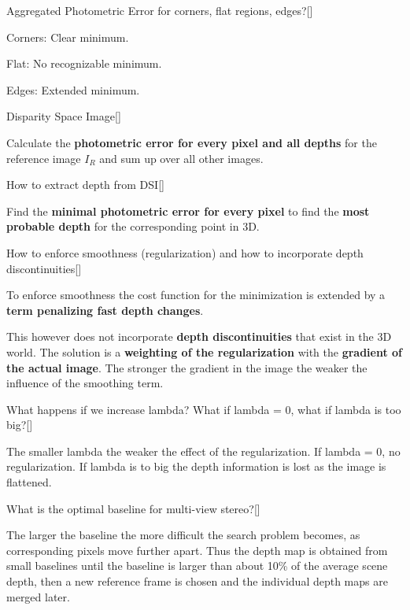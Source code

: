 \documentclass[10pt,a4paper]{scrartcl}
\begin{document}
\begin{multicols*}{2}
\begin{QandA}{Aggregated Photometric Error for corners, flat regions, edges?}[\Comparison]
\item Corners: Clear minimum.
\item Flat: No recognizable minimum.
\item Edges: Extended minimum.
\end{QandA}

\begin{QandA}{Disparity Space Image}[\Definition]
\item Calculate the \textbf{photometric error for every pixel and all depths} for the reference image $I_R$ and sum up over all other images.
\end{QandA}

\begin{QandA}{How to extract depth from DSI}[\Application]
\item Find the \textbf{minimal photometric error for every pixel} to find the \textbf{most probable depth} for the corresponding point in 3D.
\end{QandA}

\begin{QandA}{How to enforce smoothness (regularization) and how to incorporate depth discontinuities}[\Derivation]
\item To enforce smoothness the cost function for the minimization is extended by a \textbf{term penalizing fast depth changes}.
\item This however does not incorporate \textbf{depth discontinuities} that exist in the 3D world. The solution is a \textbf{weighting of the regularization} with the \textbf{gradient of the actual image}. The stronger the gradient in the image the weaker the influence of the smoothing term.
\end{QandA}

\begin{QandA}{What happens if we increase lambda? What if lambda = 0, what if lambda is too big?}[\Application]
\item The smaller lambda the weaker the effect of the regularization. If lambda = 0, no regularization. If lambda is to big the depth information is lost as the image is flattened.
\end{QandA}

\begin{QandA}
{What is the optimal baseline for multi-view stereo?}[\Application]
\item The larger the baseline the more difficult the search problem becomes, as corresponding pixels move further apart. Thus the depth map is obtained from small baselines until the baseline is larger than about 10\% of the average scene depth, then a new reference frame is chosen and the individual depth maps are merged later.
\end{QandA}


\end{multicols*}
\end{document}

